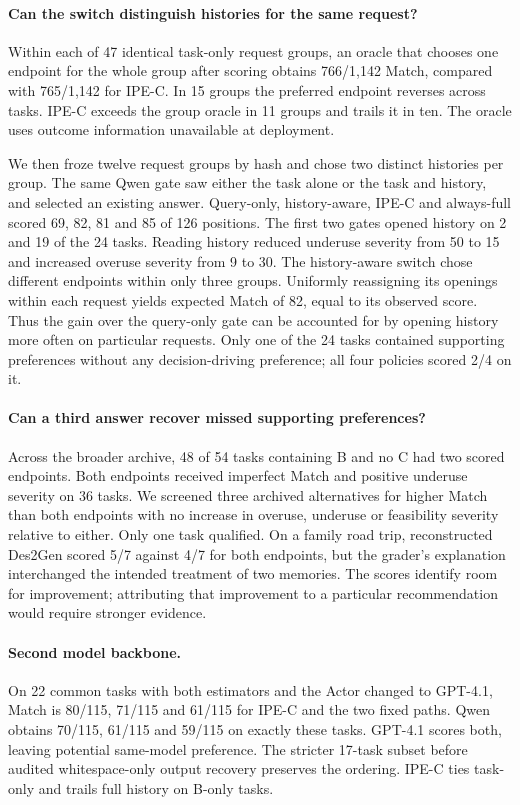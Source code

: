 \documentclass[11pt]{article}
\begin{document}
\paragraph{Can the switch distinguish histories for the same request?}
Within each of 47 identical task-only request groups, an oracle that chooses one endpoint for the whole group after scoring obtains 766/1,142 Match, compared with 765/1,142 for IPE-C. In 15 groups the preferred endpoint reverses across tasks. IPE-C exceeds the group oracle in 11 groups and trails it in ten. The oracle uses outcome information unavailable at deployment.

We then froze twelve request groups by hash and chose two distinct histories per group. The same Qwen gate saw either the task alone or the task and history, and selected an existing answer. Query-only, history-aware, IPE-C and always-full scored 69, 82, 81 and 85 of 126 positions. The first two gates opened history on 2 and 19 of the 24 tasks. Reading history reduced underuse severity from 50 to 15 and increased overuse severity from 9 to 30. The history-aware switch chose different endpoints within only three groups. Uniformly reassigning its openings within each request yields expected Match of 82, equal to its observed score. Thus the gain over the query-only gate can be accounted for by opening history more often on particular requests. Only one of the 24 tasks contained supporting preferences without any decision-driving preference; all four policies scored 2/4 on it.

\paragraph{Can a third answer recover missed supporting preferences?}
Across the broader archive, 48 of 54 tasks containing B and no C had two scored endpoints. Both endpoints received imperfect Match and positive underuse severity on 36 tasks. We screened three archived alternatives for higher Match than both endpoints with no increase in overuse, underuse or feasibility severity relative to either. Only one task qualified. On a family road trip, reconstructed Des2Gen scored 5/7 against 4/7 for both endpoints, but the grader's explanation interchanged the intended treatment of two memories. The scores identify room for improvement; attributing that improvement to a particular recommendation would require stronger evidence.

\paragraph{Second model backbone.}
On 22 common tasks with both estimators and the Actor changed to GPT-4.1, Match is 80/115, 71/115 and 61/115 for IPE-C and the two fixed paths. Qwen obtains 70/115, 61/115 and 59/115 on exactly these tasks. GPT-4.1 scores both, leaving potential same-model preference. The stricter 17-task subset before audited whitespace-only output recovery preserves the ordering. IPE-C ties task-only and trails full history on B-only tasks.
\end{document}
